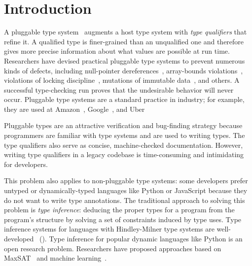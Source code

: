 \section{Introduction}
\label{sec:intro}



A pluggable type system~\cite{FosterFFA99} augments a host type system
with \emph{type qualifiers} that refine it.  A qualified type is
finer-grained than an unqualified one and therefore gives more precise
information about what values are possible at run time.
Researchers have devised practical pluggable type systems
to prevent numerous kinds of defects, including null-pointer
dereferences~\cite{BanerjeeCS2019,PapiACPE2008,DietlDEMS2011},
array-bounds violations~\cite{KelloggDME2018},
violations of locking discipline~\cite{ErnstLMST2016},
mutations of immutable data~\cite{DietlDEMS2011,PapiACPE2008,coblenz2017glacier},
and others.
A successful type-checking run proves that the undesirable behavior will
never occur.
Pluggable type systems are a standard practice in industry; for example,
they are used at Amazon~\cite{KelloggSTE2020,KelloggRSSE2020},
Google~\cite{SadowskiAEMCJ2018}, and Uber~\cite{BanerjeeCS2019}

Pluggable types are an attractive verification and bug-finding strategy
because programmers
are familiar with type systems and are used to writing types.
The type qualifiers also serve as concise, machine-checked documentation.
However, writing type qualifiers in a legacy codebase
is time-consuming and intimidating for developers.

This problem also applies to non-pluggable type systems: some developers
prefer untyped or dynamically-typed languages like Python or JavaScript
because they do not want to write type annotations.
%
The traditional approach to solving this problem is \emph{type inference}:
deducing the proper types for a program from the program's structure
by solving a set of constraints induced by type uses.
%
Type inference systems for languages with Hindley-Milner type systems
are well-developed~\cite{DamasM1982} ().
%
Type inference for popular dynamic languages like Python is an open
research problem. Researchers have proposed approaches based
on MaxSAT~\cite{hassan2018maxsmt} and machine learning~\cite{xu2016python,peng2022static}.

